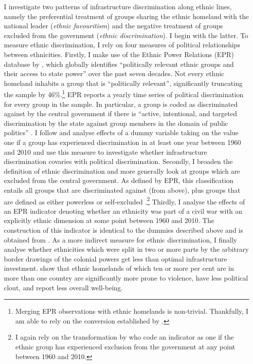 \documentclass[11pt, oneside]{article}   	%
\begin{document}
I investigate two patterns of infrastructure discrimination along ethnic lines, namely the preferential treatment of groups sharing the ethnic homeland with the national leader (\emph{ethnic favouritism}) and the negative treatment of groups excluded from the government (\emph{ethnic discrimination}). I begin with the latter. To measure ethnic discrimination, I rely on four measures of political relationships between ethnicities. Firstly, I make use of the Ethnic Power Relations (EPR) database by \cite{Vogt_IntegratingDataEthnicity_2015}, which globally identifies ``politically relevant ethnic groups and their access to state power'' \citep[p. 1328]{Vogt_IntegratingDataEthnicity_2015} over the past seven decades. Not every ethnic homeland inhabits a group that is ``politically relevant'', significantly truncating the sample by 46\%.\footnote{Merging EPR observations with ethnic homelands is non-trivial. Thankfully, I am able to rely on the conversion established by \cite{Michalopoulos_LongRunEffectsScramble_2016}.} EPR reports a yearly time series of political discrimination for every group in the sample. In particular, a group is coded as discriminated against by the central government if there is ``active, intentional, and targeted discrimination by the state against group members in the domain of public politics'' \citep[p. 1331]{Vogt_IntegratingDataEthnicity_2015}. I follow \cite{Michalopoulos_LongRunEffectsScramble_2016} and analyse effects of a dummy variable taking on the value one if a group has experienced discrimination in at least one year between 1960 and 2010 and use this measure to investigate whether infrastructure discrimination covaries with political discrimination. Secondly, I broaden the definition of ethnic discrimination and more generally look at groups which are excluded from the central government. As defined by EPR, this classification entails all groups that are discriminated against (from above), plus groups that are defined as either powerless or self-excluded \citep[p. 1331]{Vogt_IntegratingDataEthnicity_2015}.\footnote{I again rely on the transformation by \cite{Michalopoulos_LongRunEffectsScramble_2016} who code an indicator as one if the ethnic group has experienced exclusion from the government at any point between 1960 and 2010.} Thirdly, I analyse the effects of an EPR indicator denoting whether an ethnicity was part of a civil war with an explicitly ethnic dimension at some point between 1960 and 2010. The construction of this indicator is identical to the dummies described above and is obtained from \cite{Michalopoulos_LongRunEffectsScramble_2016}. As a more indirect measure for ethnic discrimination, I finally analyse whether ethnicities which were split in two or more parts by the arbitrary border drawings of the colonial powers get less than optimal infrastructure investment. \cite{Michalopoulos_LongRunEffectsScramble_2016} show that ethnic homelands of which ten or more per cent are in more than one country are significantly more prone to violence, have less political clout, and report less overall well-being.
\end{document}
